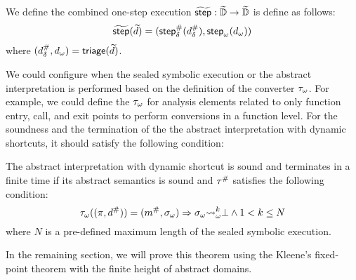 \begin{definition}
  We define the combined one-step execution $\widetilde{\textsf{step}}: \widetilde{\mathbb{D}} \rightarrow
  \widetilde{\mathbb{D}}$ is define as follows:
  \[
    \widetilde{\textsf{step}}(\widetilde{d}) = (
      {\textsf{step}}^{\#}_\delta({d}^{\#}_\delta),
      {\textsf{step}}_\omega({d}_\omega)
    )
  \]
  where $({d}^{\#}_\delta, {d}_\omega) = \textsf{triage}(\widetilde{d})$.
\end{definition}

We could configure when the sealed symbolic execution or the abstract
interpretation is performed based on the definition of the converter
${\tau}_\omega$.  For example, we could define the ${\tau}_\omega$ for analysis
elements related to only function entry, call, and exit points to perform
conversions in a function level.  For the soundness and the termination of the
the abstract interpretation with dynamic shortcuts, it should satisfy the
following condition:
\begin{theorem}\label{theorem:shortcut}
  The abstract interpretation with dynamic shortcut is sound and terminates in a
  finite time if its abstract semantics is sound and ${\tau}^{\#}$ satisfies the
  following condition:
  \[
    {\tau}_\omega((\pi, {d}^{\#})) = ({m}^{\#}, {\sigma}_\omega) \Rightarrow
    {\sigma}_\omega {\leadsto}_\omega^k \bot \wedge 1 < k \leq N
  \]
  where $N$ is a pre-defined maximum length of the sealed symbolic execution.
\end{theorem}

In the remaining section, we will prove this theorem using the Kleene's
fixed-point theorem with the finite height of abstract domains.
